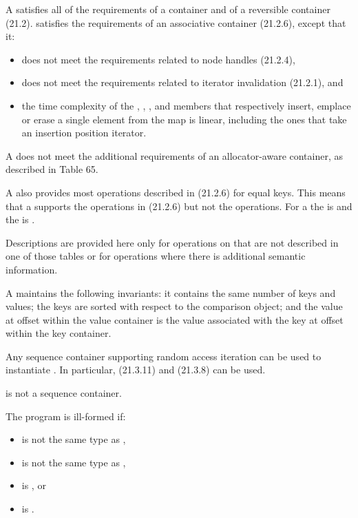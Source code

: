 \begin{addedblock}
\pnum
A  satisfies all of the requirements of a container and of a
reversible container (21.2).   satisfies
the requirements of an associative container (21.2.6), except
that it:
\begin{itemize}
\item does not meet the requirements related to node handles (21.2.4),
\item does not meet the requirements related to iterator invalidation (21.2.1), and
\item the time complexity of the , , ,
and  members that respectively insert, emplace or erase a single
element from the map is linear, including the ones that take an insertion
position iterator.
\end{itemize}
A  does not meet the additional requirements of an
allocator-aware container, as described in Table 65.

\pnum
A  also provides most operations described
in (21.2.6) for equal keys.  This means that a
 supports the  operations
in (21.2.6) but not the  operations.  For
a  the  is  and the
 is .

\pnum
Descriptions are provided here only for operations on 
that are not described in one of those tables or for operations where
there is additional semantic information.

\pnum
A  maintains the following invariants: it contains the
same number of keys and values; the keys are sorted with respect to the
comparison object; and the value at offset  within the value
container is the value associated with the key at offset  within the
key container.

\pnum
Any sequence container supporting random access iteration can be used to
instantiate . In particular,  (21.3.11)
and  (21.3.8) can be used.  \begin{note}
is not a sequence container.\end{note}

\pnum
The program is ill-formed if:
\begin{itemize}
\item {} is not the same type as ,
\item {} is not the same type as ,
\item {} is , or
\item {} is .
\end{itemize}


\end{addedblock}
